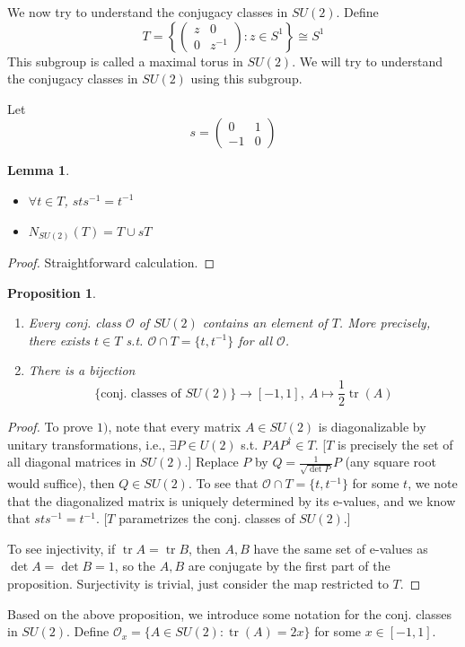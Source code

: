 \documentclass{article}
\theoremstyle{definition}
\theoremstyle{remark}
\theoremstyle{plain}
\newtheorem{lem}[defn]{Lemma}
\newtheorem{prop}[defn]{Proposition}
\begin{document}
We now try to understand the conjugacy classes in $SU(2)$.
Define 
\[T=\left\{\begin{pmatrix}
    z&0\\0&z^{-1}
\end{pmatrix}:z\in S^1\right\}\cong S^1\]
This subgroup is called a maximal torus in $SU(2)$. We will try to understand the conjugacy classes in $SU(2)$ using this subgroup.

Let \[s=\begin{pmatrix}
    0&1\\-1&0
\end{pmatrix}\]
\begin{lem}
    \begin{itemize}
        \item $\forall t\in T$, $sts^{-1}=t^{-1}$
        \item $N_{SU(2)}(T)=T\cup sT$
    \end{itemize}
\end{lem}
\begin{proof}
    Straightforward calculation.
\end{proof}
\begin{prop}
\begin{enumerate}
    \item Every conj. class $\mathcal O$ of $SU(2)$ contains an element of $T$. More precisely, there exists $t\in T$ s.t. $\mathcal O\cap T=\{t,t^{-1}\}$ for all $\mathcal O$.
    \item There is a bijection
    \[\{\text{conj. classes of }SU(2)\}\rightarrow[-1,1],\ A\mapsto \dfrac{1}{2}\operatorname{tr}(A)\]
\end{enumerate}
\end{prop}
\begin{proof}
    To prove $1)$, note that every matrix $A\in SU(2)$ is diagonalizable by unitary transformations, i.e., $\exists P\in U(2)$ s.t. $PAP^\dagger\in T$. [$T$ is precisely the set of all diagonal matrices in $SU(2)$.] Replace $P$ by $Q=\frac{1}{\sqrt{\det P}}P$ (any square root would suffice), then $Q\in SU(2)$. To see that $\mathcal O\cap T=\{t,t^{-1}\}$ for some $t$, we note that the diagonalized matrix is uniquely determined by its e-values, and we know that $sts^{-1}=t^{-1}$. [$T$ parametrizes the conj. classes of $SU(2)$.]

    To see injectivity, if $\operatorname{tr}A=\operatorname{tr} B$, then $A,B$ have the same set of e-values as $\det A=\det B=1$, so the $A,B$ are conjugate by the first part of the proposition. Surjectivity is trivial, just consider the map restricted to $T$.
\end{proof}
Based on the above proposition, we introduce some notation for the conj. classes in $SU(2)$.
Define $\mathcal O_x=\{A\in SU(2):\operatorname{tr}(A)=2x\}$ for some $x\in[-1,1]$.
\end{document}
